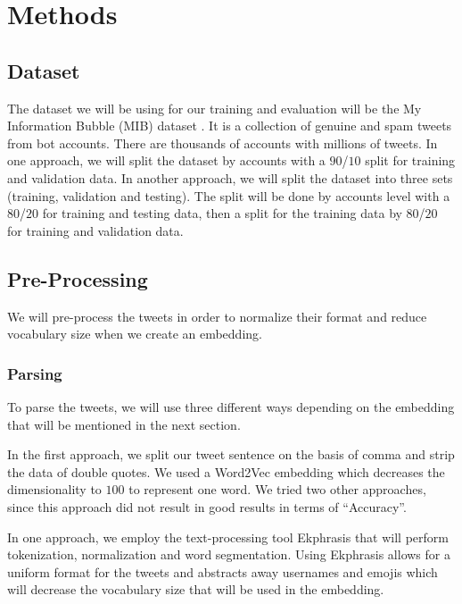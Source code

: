 \section{Methods}
\label{sec:methods}

\subsection{Dataset} The dataset we will be using for our training and
evaluation will be the My Information Bubble (MIB) dataset
\citep{Cresci:2017:PSS:3041021.3055135}. It is a collection of genuine
and spam tweets from bot accounts. There are thousands of accounts
with millions of tweets. In one approach, we will split the dataset by accounts with a
$90$/$10$ split for training and validation data. In another approach, we will split the dataset into three sets (training, validation and testing). The split will be done by accounts level with a $80$/$20$ for training and testing data, then a split for the training data by $80$/$20$ for training and validation data. 

\subsection{Pre-Processing} We will pre-process the tweets in order to
normalize their format and reduce vocabulary size when we create an
embedding.

\subsubsection{Parsing} To parse the tweets, we will use three different ways depending on the embedding that will be mentioned in the next section. 

In the first approach, we split our tweet sentence on the basis of comma and strip the data of double quotes. We used a Word2Vec embedding \citep{Mikolov:2013:DRW:2999792.2999959} which decreases the dimensionality to $100$ to represent one word. We tried two other approaches, since this approach did not result in good results in terms of ``Accuracy''.

In one approach, we employ the
text-processing tool Ekphrasis
\citep{baziotis-pelekis-doulkeridis:2017:SemEval2} that will perform
tokenization, normalization and word segmentation. Using Ekphrasis
allows for a uniform format for the tweets and abstracts away
usernames and emojis which will decrease the vocabulary size that will
be used in the embedding. 

